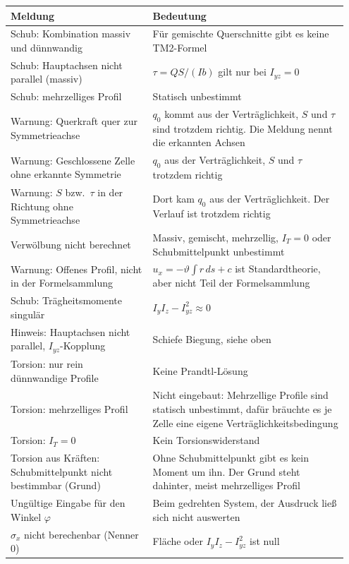 \begin{longtable}{p{0.40\linewidth}p{0.55\linewidth}}
  \toprule
  \textbf{Meldung} & \textbf{Bedeutung} \\
  \midrule \endhead
  Schub: Kombination massiv und dünnwandig & Für gemischte Querschnitte gibt es keine TM2-Formel \\
  Schub: Hauptachsen nicht parallel (massiv) & $\tau = QS/(Ib)$ gilt nur bei $I_{yz} = 0$ \\
  Schub: mehrzelliges Profil & Statisch unbestimmt \\
  Warnung: Querkraft quer zur Symmetrieachse & $q_0$ kommt aus der Verträglichkeit, $S$ und
    $\tau$ sind trotzdem richtig. Die Meldung nennt die erkannten Achsen \\
  Warnung: Geschlossene Zelle ohne erkannte Symmetrie & $q_0$ aus der Verträglichkeit, $S$ und
    $\tau$ trotzdem richtig \\
  Warnung: $S$ bzw.\ $\tau$ in der Richtung ohne Symmetrieachse & Dort kam $q_0$ aus der
    Verträglichkeit. Der Verlauf ist trotzdem richtig \\
  Verwölbung nicht berechnet & Massiv, gemischt, mehrzellig, $I_T = 0$ oder Schubmittelpunkt
    unbestimmt \\
  Warnung: Offenes Profil, nicht in der Formelsammlung & $u_x = -\vartheta\int r\,ds + c$ ist
    Standardtheorie, aber nicht Teil der Formelsammlung \\
  Schub: Trägheitsmomente singulär & $I_yI_z - I_{yz}^2 \approx 0$ \\
  Hinweis: Hauptachsen nicht parallel, $I_{yz}$-Kopplung & Schiefe Biegung, siehe oben \\
  Torsion: nur rein dünnwandige Profile & Keine Prandtl-Lösung \\
  Torsion: mehrzelliges Profil & Nicht eingebaut: Mehrzellige Profile sind statisch
    unbestimmt, dafür bräuchte es je Zelle eine eigene Verträglichkeitsbedingung \\
  Torsion: $I_T = 0$ & Kein Torsionswiderstand \\
  Torsion aus Kräften: Schubmittelpunkt nicht bestimmbar (Grund) & Ohne Schubmittelpunkt
    gibt es kein Moment um ihn. Der Grund steht dahinter, meist mehrzelliges Profil \\
  Ungültige Eingabe für den Winkel $\varphi$ & Beim gedrehten System, der Ausdruck ließ sich nicht
    auswerten \\
  $\sigma_x$ nicht berechenbar (Nenner 0) & Fläche oder $I_yI_z - I_{yz}^2$ ist null \\

\end{longtable}
